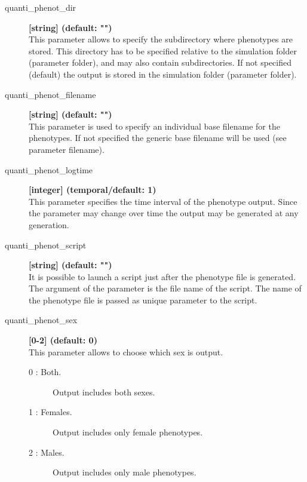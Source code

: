 \documentclass[letterpaper,12pt,oneside]{book}
\begin{document}
\begin{description}
\item[quanti\_phenot\_dir] \textbf{[string] (default: "")}\\
This parameter allows to specify the subdirectory where phenotypes are stored. This directory has to be specified relative to the simulation folder (parameter \textsf{folder}), and may also contain subdirectories. If not specified (default) the output is stored in the simulation folder (parameter \textsf{folder}).

\item[quanti\_phenot\_filename] \textbf{[string] (default: "")}\\
This parameter is used to specify an individual base filename for the phenotypes. If not specified the generic base filename will be used (see parameter \textsf{filename}).

\item[quanti\_phenot\_logtime] \textbf{[integer] (temporal/default: 1)}\\
This parameter specifies the time interval of the phenotype output. Since the parameter may change over time the output may be generated at any generation.

\item[quanti\_phenot\_script] \textbf{[string] (default: "")}\\
It is possible to launch a script just after the phenotype file is generated. The argument of the parameter is the file name of the script. The name of the phenotype file is passed as unique parameter to the script. 

\item[quanti\_phenot\_sex] \textbf{[0-2] (default: 0)}\\
This parameter allows to choose which sex is output. 
\begin{description}
\item [0 : Both.] Output includes both sexes.
\item [1 : Females.] Output includes only female phenotypes.
\item [2 : Males.] Output includes only male phenotypes.
\end{description}
\end{description}
\end{document}
